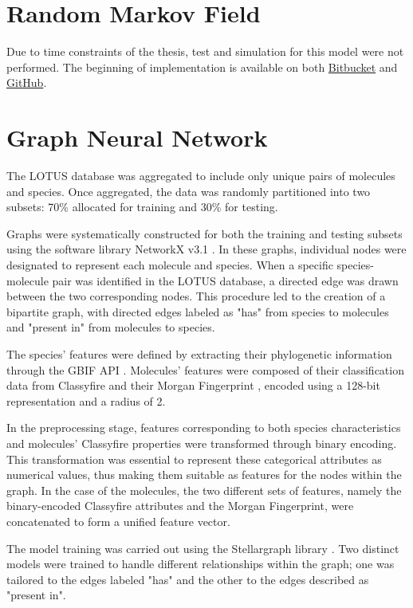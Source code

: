 \documentclass[
11pt, %
oneside, %
english, %
singlespacing, %
headsepline, %
chapterinoneline, %
]{MastersDoctoralThesis} %
\begin{document}
\section{Random Markov Field}
Due to time constraints of the thesis, test and simulation for this model were not performed. The beginning of implementation is available on both \href{https://bitbucket.org/wegmannlab/metabolite_inference/src/master/}{Bitbucket} and \href{https://github.com/anticipated-lotus/metabolite_inference}{GitHub}.

\section{Graph Neural Network}\label{sec:methods:GNN}
The LOTUS database was aggregated to include only unique pairs of molecules and species. Once aggregated, the data was randomly partitioned into two subsets: 70\% allocated for training and 30\% for testing.

Graphs were systematically constructed for both the training and testing subsets using the software library NetworkX v3.1 \cite{SciPyProceedings_11}. In these graphs, individual nodes were designated to represent each molecule and species. When a specific species-molecule pair was identified in the LOTUS database, a directed edge was drawn between the two corresponding nodes. This procedure led to the creation of a bipartite graph, with directed edges labeled as "has" from species to molecules and "present in" from molecules to species.

The species' features were defined by extracting their phylogenetic information through the GBIF API \cite{GBIF, GbifPygbif2023}. Molecules' features were composed of their classification data from Classyfire \cite{djoumboufeunangClassyFireAutomatedChemical2016} and their Morgan Fingerprint \cite{rogersExtendedConnectivityFingerprints2010}, encoded using a 128-bit representation and a radius of 2.

In the preprocessing stage, features corresponding to both species characteristics and molecules' Classyfire properties were transformed through binary encoding. This transformation was essential to represent these categorical attributes as numerical values, thus making them suitable as features for the nodes within the graph. In the case of the molecules, the two different sets of features, namely the binary-encoded Classyfire attributes and the Morgan Fingerprint, were concatenated to form a unified feature vector.

The model training was carried out using the Stellargraph library \cite{StellarGraphMachineLearning2018}. Two distinct models were trained to handle different relationships within the graph; one was tailored to the edges labeled "has" and the other to the edges described as "present in".
\end{document}
